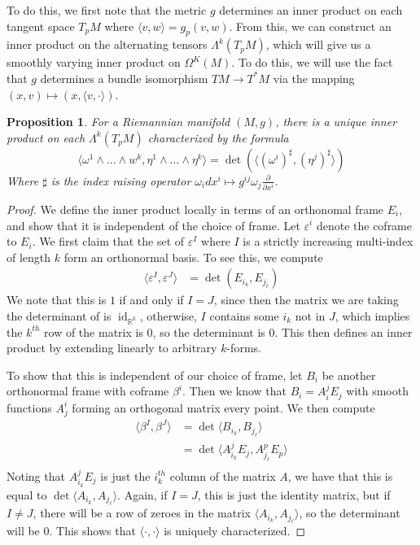 \documentclass[psamsfonts]{amsart}
\newtheorem{prop}[thm]{Proposition}
\theoremstyle{definition}
\theoremstyle{remark}
\newcommand{\R}{\mathbb{R}}
\DeclareMathOperator{\id}{id}
\begin{document}
To do this, we first note that the metric $g$ determines an inner product on each tangent space $T_pM$ where $\langle v, w \rangle = g_p(v,w)$. From this, we can construct an inner product on the alternating tensors $\Lambda^k(T_pM)$, which will give us a smoothly varying inner product on $\Omega^K(M)$. To  do this, we will use the fact that $g$ determines a bundle isomorphism $TM \to  T^*M$ via the mapping $(x,v) \mapsto (x, \langle v, \cdot \rangle )$.
%
\begin{prop}
For a Riemannian manifold $(M,g)$,  there is a unique inner product on each $\Lambda^k(T_pM)$ characterized by the formula
$$\langle \omega^1 \wedge \ldots \wedge w^k, \eta^1 \wedge \ldots \wedge \eta^k \rangle = \det\left( \big\langle (\omega^i)^\sharp, (\eta^j)^\sharp \big\rangle \right)$$
Where $\sharp$ is the index raising operator $\omega_i dx^i \mapsto g^{ij}\omega_j\frac{\partial}{\partial x^i}$.
\end{prop}
%
\begin{proof}
We define the inner product locally in terms of an orthonomal frame $E_i$, and show that it is independent of the choice of frame. Let $\varepsilon^i$  denote the coframe to  $E_i$. We first claim that the set of $\varepsilon^I$ where $I$  is a strictly increasing multi-index of length $k$ form an orthonormal basis. To see this, we compute 
\begin{align*}
\langle \varepsilon^I, \varepsilon^J \rangle &= \det\left( E_{i_k}, E_{j_\ell} \right) 
\end{align*}
We note that this is $1$ if and only if $I = J$, since then the matrix we are taking the determinant of is $\id_{\R^k}$, otherwise, $I$  contains some $i_k$ not in  $J$, which implies the $k^{th}$ row of the matrix is $0$, so the determinant is $0$. This then defines an inner product by extending linearly to arbitrary $k$-forms.

To show that this is independent of our choice of frame, let  $B_i$ be another orthonormal frame with coframe $\beta^i$. Then we know that $B_i = A^j_iE_j$ with smooth functions $A^i_j$ forming an orthogonal matrix every point. We then compute
\begin{align*}
\langle \beta^I, \beta^J \rangle &= \det \langle B_{i_k}, B_{j_\ell} \rangle \\
&= \det\langle A^j_{i_k}E_j, A^p_{j_\ell}E_p \rangle \\
\end{align*}
Noting that $A^j_{i_k}E_j$ is just the $i_k^{th}$ column of the matrix $A$, we have that this is equal to $\det \langle A_{i_k}, A_{j_\ell} \rangle$. Again, if $I = J$, this is just the identity matrix, but if $I \neq J$, there will be a row of zeroes in the matrix $\langle A_{i_k}, A_{j_\ell}\rangle$, so the determinant will be $0$. This shows that $\langle \cdot, \cdot \rangle$  is uniquely characterized. 
\end{proof}
\end{document}
